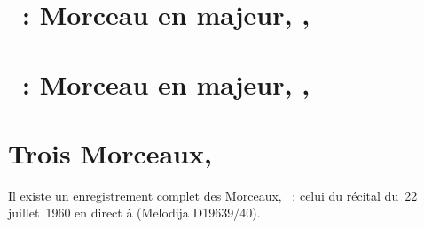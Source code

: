 \section{\ifChrono \Scriabine{}~: \fi
Morceau en \kC majeur,  , }
\label{\thesection}

\begin{workitemize}
 \item{}
 \begin{perfitemize}
  \item{}
  \item{}
 \end{perfitemize}
\end{workitemize}

\section{\ifChrono \Scriabine{}~: \fi
Morceau en \kE \Flat majeur,  , }
\label{\thesection}

\begin{workitemize}
 \item{}
 \begin{perfitemize}
  \item{}
 \end{perfitemize}
 \item{}
 \begin{perfitemize}
  \item\NoEdition{}
 \end{perfitemize}
\end{workitemize}

\section*{%
Trois Morceaux, }

Il existe un enregistrement complet des Morceaux, ~: celui du
récital du~22 juillet~1960 en direct à \MSHM (Melodija D19639/40).

